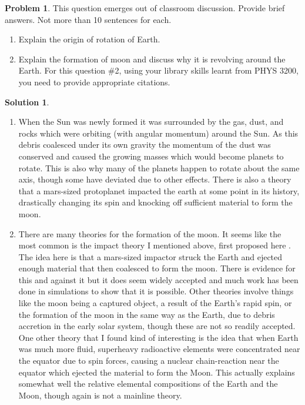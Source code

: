 \documentclass[10pt]{article}
\theoremstyle{definition}
\newtheorem{problem}{Problem}
\newtheorem{soln}{Solution}
\begin{document}
\begin{problem}
This question emerges out of classroom discussion. Provide brief answers. Not more than
10 sentences for each.
\begin{enumerate}[label=(\roman*)]
  \item Explain the origin of rotation of Earth.
  \item Explain the formation of moon and discuss why it is revolving around the Earth. For this question \#2,
        using your library skills learnt from PHYS 3200, you need to provide appropriate
        citations.
\end{enumerate}
\end{problem}
\begin{soln}~
  \begin{enumerate}[label=(\roman*)]
    \item When the Sun was newly formed it was surrounded by the gas, dust, and rocks which were orbiting (with angular momentum) around the Sun.
          As this debris coalesced under its own gravity the momentum of the dust was conserved and caused the growing masses which would become planets to rotate. This is also
          why many of the planets happen to rotate about the same axis, though some have deviated due to other effects. There is also a theory that a mars-sized protoplanet
          impacted the earth at some point in its history, drastically changing its spin and knocking off sufficient material to form the moon.
    \item There are many theories for the formation of the moon. It seems like the most common is the impact theory I mentioned above, first proposed here \cite{HARTMANN1975504}.
          The idea here is that a mars-sized impactor struck the Earth and ejected enough material that then coalesced to form the moon. There is evidence for this and against it but
          it does seem widely accepted and much work has been done in simulations to show that it is possible. Other theories involve things like the moon being a captured object,
          a result of the Earth's rapid spin, or the formation of the moon in the same way as the Earth, due to debris accretion in the early solar system, though these are not
          so readily accepted. One other theory \cite{AnisichkinV.F.1997Dpb} that I found kind of interesting is the idea that when Earth was much more fluid, superheavy radioactive elements were concentrated
          near the equator due to spin forces, causing a nuclear chain-reaction near the equator which ejected the material to form the Moon. This actually explains somewhat
          well the relative elemental compositions of the Earth and the Moon, though again is not a mainline theory.
  \end{enumerate}
\end{soln}
\end{document}
